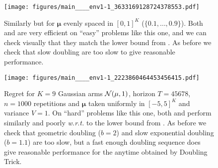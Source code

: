 \documentclass[12pt]{colt2018} %
\begin{document}
%
%
\begin{figure}[H]
    \centering
    \texttt{[image: figures/main\_\_\_\_env1-1\_3633169128724378553.pdf]}
    \caption{Similarly but for $\boldsymbol{\mu}$ evenly spaced in $[0,1]^K$ ($\{0.1,\dots,0.9\}$). Both \KLUCB{} and \KLUCBpp{} are very efficient on ``easy'' problems like this one, and we can check visually that they match the lower bound from \cite{LaiRobbins85}. As before we check that slow doubling are too slow to give reasonable performance.}
    \label{fig:bernoulliBandits_DoublingTrick_Restart_fixedProblem}
    \vspace*{-15pt}  %
\end{figure}
%
%
%
\begin{figure}[!h]
    \centering
    \texttt{[image: figures/main\_\_\_\_env1-1\_2223860464453456415.pdf]}
    \caption{Regret for $K=9$ Gaussian arms $\mathcal{N}(\mu, 1)$, horizon $T=45678$, $n=1000$ repetitions and $\boldsymbol{\mu}$ taken uniformly in $[-5,5]^K$ and variance $V=1$. On ``hard'' problems like this one, both \UCB{} and \AFHG{} perform similarly and poorly \emph{w.r.t.} to the lower bound from \cite{LaiRobbins85}. As before we check that geometric doubling ($b=2$) and slow exponential doubling ($b=1.1$) are too slow, but a fast enough doubling sequence does give reasonable performance for the anytime \AFHG{} obtained by Doubling Trick.}
    \label{fig:gaussianBandits_DoublingTrick_Restart_fixedProblem}
\end{figure}


\end{document}
